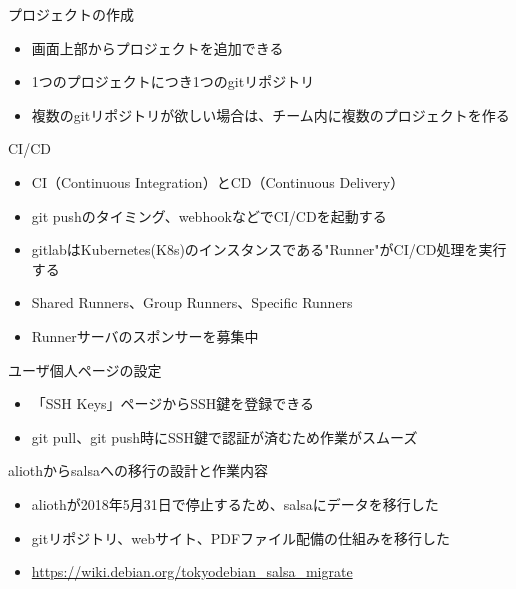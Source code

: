 \begin{frame}[containsverbatim]{プロジェクトの作成}
  \begin{itemize}
  \item 画面上部からプロジェクトを追加できる
  \item 1つのプロジェクトにつき1つのgitリポジトリ
  \item 複数のgitリポジトリが欲しい場合は、チーム内に複数のプロジェクトを作る
  \end{itemize}
\end{frame}

\begin{frame}[containsverbatim]{CI/CD}
  \begin{itemize}
  \item CI（Continuous Integration）とCD（Continuous Delivery）
  \item git pushのタイミング、webhookなどでCI/CDを起動する
  \item gitlabはKubernetes(K8s)のインスタンスである"Runner"がCI/CD処理を実行する
  \item Shared Runners、Group Runners、Specific Runners
  \item Runnerサーバのスポンサーを募集中
  \end{itemize}
\end{frame}

\begin{frame}[containsverbatim]{ユーザ個人ページの設定}
  \begin{itemize}
  \item 「SSH Keys」ページからSSH鍵を登録できる
  \item git pull、git push時にSSH鍵で認証が済むため作業がスムーズ
  \end{itemize}
\end{frame}



\begin{frame}[containsverbatim]{aliothからsalsaへの移行の設計と作業内容}
  \begin{itemize}
  \item aliothが2018年5月31日で停止するため、salsaにデータを移行した
  \item gitリポジトリ、webサイト、PDFファイル配備の仕組みを移行した
  \item \url{https://wiki.debian.org/tokyodebian_salsa_migrate}
  \end{itemize}
\end{frame}

